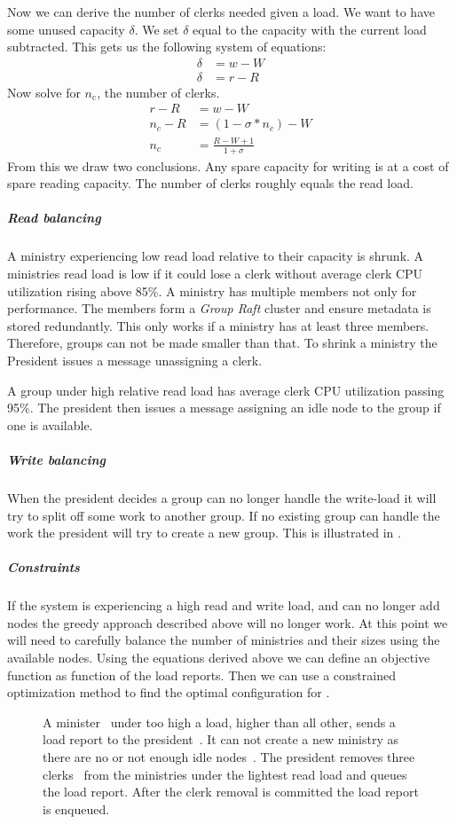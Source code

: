 Now we can derive the number of clerks needed given a load. We want to have some unused capacity $\delta$. We set $\delta$ equal to the capacity with the current load subtracted. This gets us the following system of equations: 
\begin{align}
	\delta &= w - W \\
	\delta &= r - R
\end{align}%
Now solve for $n_\text{c}$, the number of clerks.
\begin{align}
	r - R &= w - W \\
	n_c - R &= \left(1 - \sigma*n_c\right) - W \\
	n_c &= \frac{R - W + 1}{1 + \sigma} \label{eq:nc}
\end{align}
From this we draw two conclusions. Any spare capacity for writing is at a cost of spare reading capacity. The number of clerks roughly equals the read load.
%
%
\subparagraph*{Read balancing}
A ministry experiencing low read load relative to their capacity is shrunk. A ministries read load is low if it could lose a clerk without average clerk CPU utilization rising above 85\%. A ministry has multiple members not only for performance. The members form a \textit{Group Raft} cluster and ensure metadata is stored redundantly. This only works if a ministry has at least three members. Therefore, groups can not be made smaller than that. To shrink a ministry the President issues a \raft{} message unassigning a clerk. 

A group under high relative read load has average clerk CPU utilization passing 95\%. The president then issues a \raft{} message assigning an idle node to the group if one is available. %
%
\subparagraph*{Write balancing}
When the president decides a group can no longer handle the write-load it will try to split off some work to another group. If no existing group can handle the work the president will try to create a new group. This is illustrated in .
%
\subparagraph*{Constraints}
If the system is experiencing a high read and write load, and can no longer add nodes the greedy approach described above will no longer work. At this point we will need to carefully balance the number of ministries and their sizes using the available nodes. Using the equations derived above we can define an objective function as function of the load reports. Then we can use a constrained optimization method to find the optimal configuration for \name{}.
%
\begin{figure}[htbp]
	\centering
	
	\caption{A minister~\amdsLeg{} under too high a load, higher than all other, sends a load report to the president~\presidentLeg{}. It can not create a new ministry as there are no or not enough idle nodes~\umdsLeg{}. The president removes three clerks~\cmdsLeg{} from the ministries under the lightest read load and queues the load report. After the clerk removal is committed the load report is enqueued. }
	\label{fig:subtree}
\end{figure}
